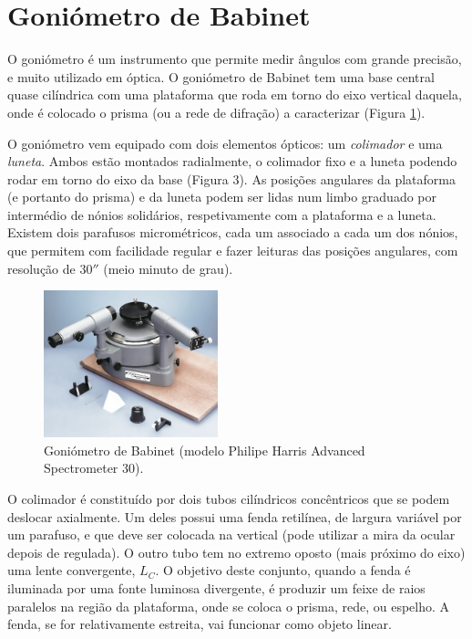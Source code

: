 \documentclass[a4paper,12pt]{article}      %
\begin{document}
\section{\sf Goniómetro de Babinet}
O goniómetro é um instrumento que permite medir ângulos com grande precisão, e muito utilizado em óptica. O goniómetro de Babinet tem uma base central quase cilíndrica com uma plataforma que roda em torno do eixo vertical daquela, onde é colocado o prisma (ou a rede de difração) a caracterizar (Figura \ref{fig:goniometer}). 

O goniómetro vem equipado com dois elementos ópticos: um \emph{colimador} e uma \emph{luneta}. Ambos estão montados radialmente, o colimador fixo e a luneta podendo rodar em torno do eixo da base (Figura 3). As posições angulares da plataforma (e portanto do prisma) e da luneta podem ser lidas num limbo graduado por intermédio de nónios solidários, respetivamente com a plataforma e a luneta. Existem dois parafusos micrométricos, cada um associado a cada um dos nónios, que permitem com facilidade regular e fazer leituras das posições angulares, com resolução de $30''$ (meio minuto de grau).

\begin{figure}[htb]  
\centering 
	\includegraphics[width=0.45\textwidth]{goniometer}
	\caption{Goniómetro de Babinet (modelo Philipe Harris Advanced Spectrometer 30). \label{fig:goniometer}} 
\end{figure}

O colimador é constituído por dois tubos cilíndricos concêntricos que se podem deslocar axialmente. Um deles possui uma fenda retilínea, de largura variável por um parafuso, e que deve ser colocada na vertical (pode utilizar a mira da ocular depois de regulada). O outro tubo tem no extremo oposto (mais próximo do eixo) uma lente convergente, $L_C$. O objetivo deste conjunto, quando a fenda é iluminada por uma fonte luminosa divergente, é produzir um feixe de raios paralelos na região da plataforma, onde se coloca o prisma, rede, ou espelho. A fenda, se for relativamente estreita, vai funcionar como objeto linear.
\end{document}
